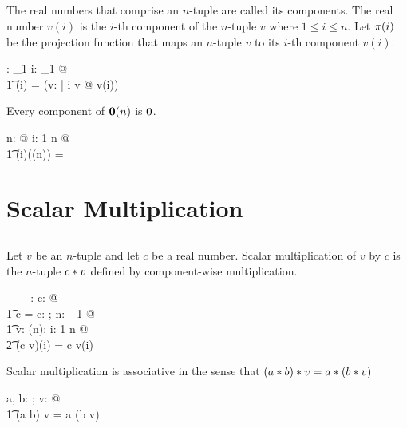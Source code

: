 \documentclass[11pt, oneside]{article}
\begin{document}
\subsection{}

The real numbers that comprise an $n$-tuple are called its components.
The real number $v(i)$ is the $i$-th component of the $n$-tuple $v$ where
$1 \le i \le n$.
Let $\pi(i)$ be the projection function that maps an $n$-tuple $v$ to its $i$-th component $v(i)$.

\begin{axdef}
	\piR: \nat_1 \fun \Rinf \pfun \R
\where
	\forall i: \nat_1 @ \\
	\t1	\piR(i) = (\lambda v: \Rinf | i \in \dom v @ v(i))
\end{axdef}

\begin{remark}
Every component of $\mathbf{0}(n)$ is $0$.

\begin{zed}
	\forall n: \nat @ \forall i: 1 \upto n @ \\
	\t1	\piR(i)(\zeroRn(n)) = \zeroR
\end{zed}

\end{remark}

\section{Scalar Multiplication}

\subsection{}

Let $v$ be an $n$-tuple and let $c$ be a real number.
Scalar multiplication of $v$ by $c$ is the $n$-tuple $c \mathbin{*} v$ defined by component-wise multiplication.

\begin{axdef}
	\_ \smulR \_ : \R \cross \Rinf \fun \Rinf 
\where
	\forall c: \R @ \\
	\t1	c \smulR \langle \rangle = \langle \rangle
\also
	\forall c: \R; n: \nat_1 @ \\
	\t1	\forall v: \Rtuples(n); i: 1 \upto n @ \\
	\t2		(c \smulR v)(i) = c \mulR v(i)
\end{axdef}

\begin{remark}
Scalar multiplication is associative in the sense that $(a \mathbin{*} b) \mathbin{*} v = a \mathbin{*} (b \mathbin{*} v)$

\begin{zed}
	\forall a, b: \R; v: \Rinf @ \\
	\t1	(a \mulR b) \smulR v = a \smulR (b \smulR v)
\end{zed}

\end{remark}
\end{document}
